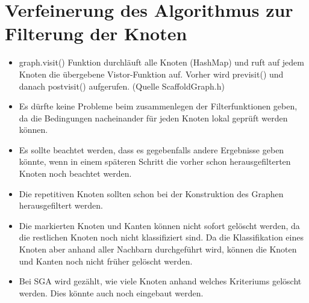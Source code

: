 \documentclass[a4paper,10pt,parskip]{scrartcl}
\begin{document}
\section{Verfeinerung des Algorithmus zur Filterung der Knoten}

\begin{itemize}
\item graph.visit() Funktion durchläuft alle Knoten (HashMap) und ruft
  auf jedem Knoten die übergebene Vistor-Funktion auf. Vorher wird
  previsit() und danach postvisit() aufgerufen. (Quelle
  ScaffoldGraph.h)
\item Es dürfte keine Probleme beim zusammenlegen der Filterfunktionen
  geben, da die Bedingungen nacheinander für jeden Knoten lokal
  geprüft werden können.
\item Es sollte beachtet werden, dass es gegebenfalls andere
  Ergebnisse geben könnte, wenn in einem späteren Schritt die vorher
  schon herausgefilterten Knoten noch beachtet werden.
\item Die repetitiven Knoten sollten schon bei der Konstruktion des
  Graphen herausgefiltert werden.
\item Die markierten Knoten und Kanten können nicht sofort gelöscht
  werden, da die restlichen Knoten noch nicht klassifiziert sind. Da
  die Klassifikation eines Knoten aber anhand aller Nachbarn
  durchgeführt wird, können die Knoten und Kanten noch nicht früher
  gelöscht werden.
\item Bei SGA wird gezählt, wie viele Knoten anhand welches Kriteriums
  gelöscht werden. Dies könnte auch noch eingebaut werden.
\end{itemize}
\end{document}

